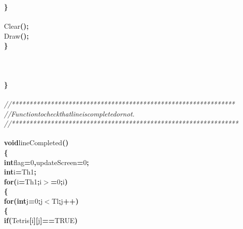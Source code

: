 \documentclass[a4paper, 10pt]{article}
\newcommand\SPC{\hspace*{0.6em}}
\newcommand\HYP{\mbox{\char 45}}
\newcommand{\CppAComment}[1]{\textit{\textcolor[rgb]{0.2,0.6,1}{#1}}}
\newcommand{\CppAIdentifier}[1]{#1}
\newcommand{\CppANumber}[1]{\textcolor[rgb]{0.5,0,0.5}{#1}}
\newcommand{\CppAReservedWord}[1]{\textbf{#1}}
\newcommand{\CppASpace}[1]{\colorbox[rgb]{1,1,1}{#1}}
\newcommand{\CppASymbol}[1]{\textbf{\textcolor[rgb]{1,0,0}{#1}}}
\begin{document}
\begin{ttfamily}
\CppASpace{\SPC \SPC }\CppASymbol{\}}\\
\\
\CppASpace{\SPC \SPC }\CppAIdentifier{Clear}\CppASymbol{(}\CppASymbol{)}\CppASymbol{;}\\
\CppASpace{\SPC \SPC }\CppAIdentifier{Draw}\CppASymbol{(}\CppASymbol{)}\CppASymbol{;}\\
\CppASpace{\SPC }\CppASymbol{\}}\\
\\
\\
\\
\CppASymbol{\}}\\
\\
\CppAComment{//***************************************************************}\\
\CppAComment{//\SPC \SPC \SPC Function\SPC to\SPC check\SPC that\SPC line\SPC is\SPC completed\SPC or\SPC not.}\\
\CppAComment{//****************************************************************}\\
\\
\CppAReservedWord{void}\CppASpace{\SPC }\CppAIdentifier{lineCompleted}\CppASymbol{(}\CppASymbol{)}\\
\CppASymbol{\{}\\
\CppASpace{\SPC }\CppAReservedWord{int}\CppASpace{\SPC }\CppAIdentifier{flag}\CppASymbol{=}\CppANumber{0}\CppASymbol{,}\CppASpace{\SPC }\CppAIdentifier{updateScreen}\CppASymbol{=}\CppANumber{0}\CppASymbol{;}\\
\CppASpace{\SPC }\CppAReservedWord{int}\CppASpace{\SPC }\CppAIdentifier{i}\CppASymbol{=}\CppAIdentifier{Th}\CppASymbol{\HYP }\CppANumber{1}\CppASymbol{;}\\
\CppASpace{\SPC }\CppAReservedWord{for}\CppASymbol{(}\CppAIdentifier{i}\CppASymbol{=}\CppAIdentifier{Th}\CppASymbol{\HYP }\CppANumber{1}\CppASymbol{;}\CppAIdentifier{i}\CppASymbol{$>$=}\CppANumber{0}\CppASymbol{;}\CppAIdentifier{i}\CppASymbol{\HYP \HYP }\CppASymbol{)}\\
\CppASpace{\SPC }\CppASymbol{\{}\\
\CppASpace{\SPC \SPC }\CppAReservedWord{for}\CppASymbol{(}\CppAReservedWord{int}\CppASpace{\SPC }\CppAIdentifier{j}\CppASymbol{=}\CppANumber{0}\CppASymbol{;}\CppAIdentifier{j}\CppASymbol{$<$}\CppAIdentifier{Tl}\CppASymbol{;}\CppAIdentifier{j}\CppASymbol{++}\CppASymbol{)}\\
\CppASpace{\SPC \SPC }\CppASymbol{\{}\\
\CppASpace{\SPC \SPC \SPC }\CppAReservedWord{if}\CppASymbol{(}\CppAIdentifier{Tetris}\CppASymbol{[}\CppAIdentifier{i}\CppASymbol{]}\CppASymbol{[}\CppAIdentifier{j}\CppASymbol{]}\CppASymbol{==}\CppAIdentifier{TRUE}\CppASymbol{)}\\

\end{ttfamily}
\end{document}
